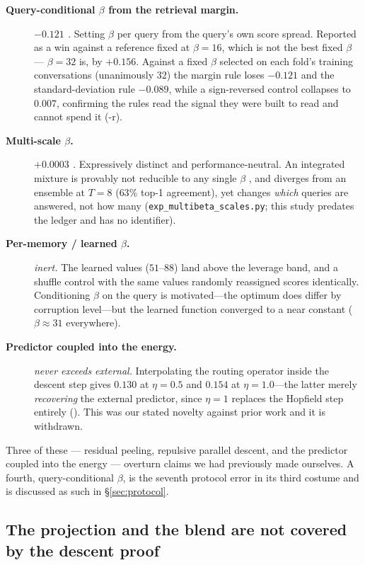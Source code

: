 \begin{description}
\item[\textnormal{\textbf{Query-conditional $\beta$ from the retrieval margin.}}] \emph{$-0.121$ .} Setting $\beta$ per query from the query's own score spread. Reported as a win against a reference fixed at $\beta{=}16$, which is not the best fixed $\beta$ --- $\beta{=}32$ is, by $+0.156$. Against a fixed $\beta$ selected on each fold's training conversations (unanimously $32$) the margin rule loses $-0.121$ and the standard-deviation rule $-0.089$, while a sign-reversed control collapses to $0.007$, confirming the rules read the signal they were built to read and cannot spend it (-r).
\item[\textnormal{\textbf{Multi-scale $\beta$.}}] \emph{$+0.0003$ .} Expressively distinct and performance-neutral. An integrated mixture is provably not reducible to any single $\beta$ \citep{yang2018softmax}, and diverges from an ensemble at $T{=}8$ ($63\%$ top-1 agreement), yet changes \emph{which} queries are answered, not how many (\texttt{exp\_multibeta\_scales.py}; this study predates the ledger and has no  identifier).
\item[\textnormal{\textbf{Per-memory / learned $\beta$.}}] \emph{inert.} The learned values ($51$--$88$) land above the leverage band, and a shuffle control with the same values randomly reassigned scores identically. Conditioning $\beta$ on the query is motivated---the optimum does differ by corruption level---but the learned function converged to a near constant ($\beta{\approx}31$ everywhere).
\item[\textnormal{\textbf{Predictor coupled into the energy.}}] \emph{never exceeds external.} Interpolating the routing operator inside the descent step gives $0.130$ at $\eta{=}0.5$ and $0.154$ at $\eta{=}1.0$---the latter merely \emph{recovering} the external predictor, since $\eta{=}1$ replaces the Hopfield step entirely (). This was our stated novelty against prior work \citep{dury2026pam} and it is withdrawn.
\end{description}

Three of these --- residual peeling, repulsive parallel descent, and the predictor coupled
into the energy --- overturn claims we had previously made ourselves. A fourth,
query-conditional $\beta$, is the seventh protocol error in its third costume and is
discussed as such in \S\ref{sec:protocol}.

\subsection{The projection and the blend are not covered by the descent proof}
\label{app:projection}

